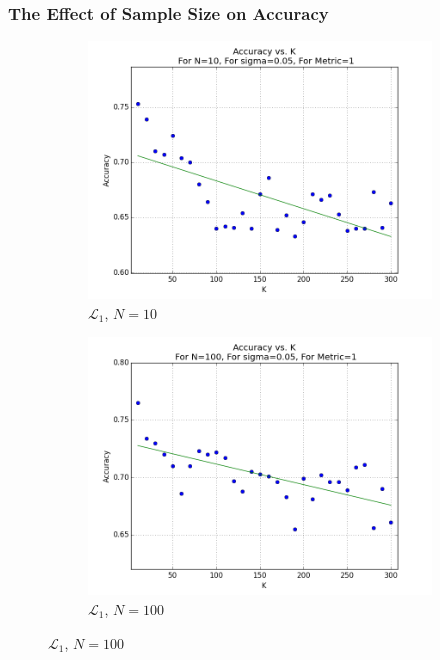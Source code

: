 \documentclass{article}
\begin{document}
\subsubsection{The Effect of Sample Size on Accuracy}
\begin{figure}[H]
    \centering
    \begin{subfigure}[h]{0.75\textwidth}
        \includegraphics[width=\textwidth]{l-experiment1-2-accuracy-k-n-10-s-005-l1.png}
        \caption{$\mathcal{L}_1$, $N=10$}
        \label{fig:exp2k1-1}
    \end{subfigure}
   \begin{subfigure}[h]{0.75\textwidth}
        \includegraphics[width=\textwidth]{l-experiment1-2-accuracy-k-n-100-s-005-l1.png}
        \caption{$\mathcal{L}_1$, $N=100$}
        \label{fig:exp2k2-1}
    \end{subfigure}
\end{figure}
\end{document}
